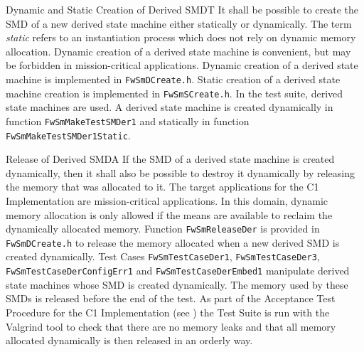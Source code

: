 \documentclass[a4paper,10pt]{article}
\newenvironment{fw_req}[6]
{\addtocounter{subsubsection}{1}
	\hspace{0.2cm}\textbf{FW-\arabic{section}.\arabic{subsection}.\arabic{subsubsection}/#2
	\hspace{0.8cm} #1}
	\vspace{-10pt}
\begin{longtable}{p{2.7cm}P{8.5cm}}
\hline
\textsc{Requirement} & #3 \\
\textsc{Justification} & #4 \\
\textsc{Implementation} & #5  \\ 
\textsc{Verification} & #6  \\
\hline
}
{\end{longtable}}
\newenvironment{fw_req_note}[7]
{\addtocounter{subsubsection}{1}
	\hspace{0.2cm}\textbf{FW-\arabic{section}.\arabic{subsection}.\arabic{subsubsection}/#2
	\hspace{0.8cm} #1}
	\vspace{-10pt}
\begin{longtable}{p{2.7cm}P{8.5cm}}
\hline
\textsc{Requirement} & #3 \\
\textsc{Note} & #4 \\
\textsc{Justification} & #5 \\
\textsc{Implementation} & #6  \\ 
\textsc{Verification} & #7  \\
\hline
}
{\end{longtable}}
\begin{document}
\begin{fw_req_note}{Dynamic and Static Creation of Derived SMD}{T}
{It shall be possible to create the SMD of a new derived state 
machine either statically or dynamically.}
{The term \emph{static} refers to an instantiation process which 
does not rely on dynamic memory allocation.}
{Dynamic creation of a derived state machine is convenient, 
but may be forbidden in mission-critical applications.}
{Dynamic creation of a derived state machine is implemented in
\texttt{FwSmDCreate.h}. 
Static creation of a derived state machine creation is implemented in \texttt{FwSmSCreate.h}.} 
{In the test suite, derived state machines are used. 
A derived state machine is created dynamically in function \texttt{FwSmMakeTestSMDer1} 
and statically in function \texttt{FwSmMakeTestSMDer1Static}.}
\end{fw_req_note}

\newpage
\begin{fw_req}{Release of Derived SMD}{A}
{If the SMD of a derived state machine is created dynamically, 
then it shall also be possible to destroy it dynamically by releasing the memory that 
was allocated to it.}
{The target applications for the C1 Implementation are 
mission-critical applications. 
In this domain, dynamic memory allocation is only allowed if the means are available 
to reclaim the dynamically allocated memory.}
{Function \texttt{FwSmReleaseDer} is provided in 
\texttt{FwSmDCreate.h} to release the memory allocated when a new derived SMD is 
created dynamically.} 
{Test Cases \texttt{FwSmTestCaseDer1}, \texttt{FwSmTestCaseDer3}, 
\texttt{FwSmTestCaseDerConfigErr1} and 
\texttt{FwSmTestCaseDerEmbed1} manipulate derived state machines whose SMD is created dynamically.
The memory used by these SMDs is released before the end of the test. 
As part of the Acceptance Test Procedure for the C1 Implementation (see \cite{ref:um})
the Test Suite is run with the Valgrind tool to check that there are no memory 
leaks and that all memory allocated dynamically is then released in an orderly way.}
\end{fw_req}
\end{document}

